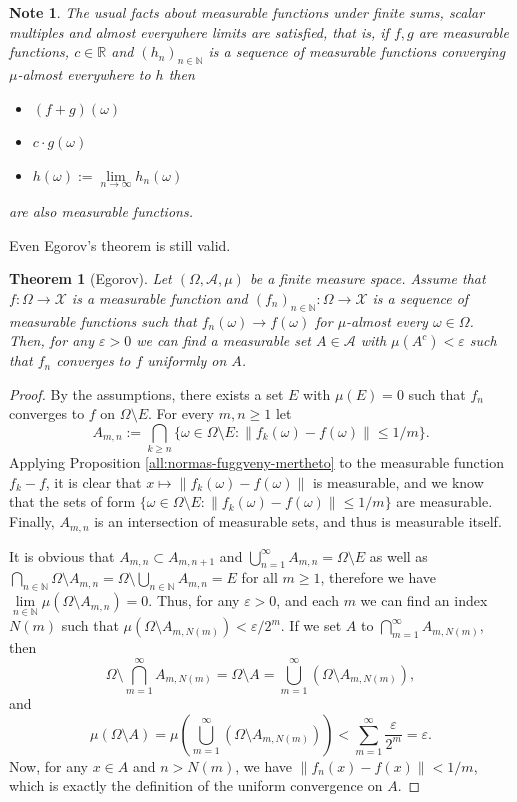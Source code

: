 \documentclass[a4paper, 12pt]{article}
\newtheorem{theo}[lem]{Theorem}
\newtheorem{note}[lem]{Note}
\begin{document}
\begin{note}\normalfont The usual facts about measurable functions under finite sums, scalar multiples and almost everywhere limits are satisfied, that is, if $f, g$ are measurable functions, $c \in \mathbb{R}$ and $(h_n)_{n \in \mathbb{N}}$ is a sequence of measurable functions converging $\mu$-almost everywhere to $h$ then
\begin{itemize}
\item $(f+g)(\omega)$
\item $c\cdot g(\omega)$
\item $h(\omega) := \lim\limits_{n \to \infty} h_n(\omega)$
\end{itemize}
are also measurable functions.
\end{note}
Even Egorov's theorem is still valid.
\begin{theo}[Egorov] \label{all:egorov} Let $(\Omega, \mathcal{A}, \mu)$ be a finite measure space. Assume that $f \colon \Omega \rightarrow \mathcal{X}$ is a measurable function and $(f_n)_{n \in \mathbb{N}} \colon \Omega \rightarrow \mathcal{X}$ is a sequence of measurable functions such that $f_n(\omega) \rightarrow f(\omega)$ for $\mu$-almost every $\omega \in \Omega$. Then, for any $\varepsilon > 0$ we can find a measurable set $A \in \mathcal{A}$ with $\mu(A^c) < \varepsilon$ such that $f_n$ converges to $f$ uniformly on $A$.
\end{theo}
\begin{proof} By the assumptions, there exists a set $E$ with $\mu(E)=0$ such that $f_n$ converges to $f$ on $\Omega \setminus E$. For every $m, n \geqslant 1$ let $$A_{m,n} := \bigcap_{k \geqslant n} \lbrace \omega \in \Omega \setminus E : \| f_k(\omega) - f(\omega) \| \leqslant 1/m \rbrace.$$ Applying Proposition \ref{all:normas-fuggveny-mertheto} to the measurable function $f_k - f$, it is clear that $x \mapsto \| f_k(\omega) - f(\omega) \|$ is measurable, and we know that the sets of form $\lbrace \omega \in \Omega \setminus E : \| f_k(\omega) - f(\omega) \| \leqslant 1/m \rbrace$ are measurable. Finally, $A_{m,n}$ is an intersection of measurable sets, and thus is measurable itself.

It is obvious that $A_{m, n} \subset A_{m, n+1}$ and $\bigcup^{\infty}_{n=1} A_{m,n} = \Omega \setminus E$ as well as $\bigcap_{n \in \mathbb{N}} \Omega \setminus A_{m,n} = \Omega \setminus \bigcup_{n \in  \mathbb{N}} A_{m,n} = E$ for all $m \geqslant 1$, therefore we have $\lim\limits_{n \in \mathbb{N}} \mu(\Omega \setminus A_{m,n}) = 0$. Thus, for any $\varepsilon > 0$, and each $m$ we can find an index $N(m)$ such that $\mu \left( \Omega \setminus A_{m, N(m)} \right) < \varepsilon / 2^m$. If we set $A$ to $\bigcap^{\infty}_{m=1} A_{m,N(m)}$, then 
$$
\Omega \setminus \bigcap^{\infty}_{m=1} A_{m,N(m)} = \Omega \setminus A = \bigcup^{\infty}_{m=1} \left( \Omega \setminus A_{m,N(m)} \right),
$$
and 
$$
\mu\left( \Omega \setminus A \right) = \mu \left(  \bigcup^{\infty}_{m=1} \left( \Omega \setminus A_{m,N(m)} \right) \right) < \sum^{\infty}_{m=1} \frac{\varepsilon}{2^m} = \varepsilon.
$$
Now, for any $x \in A$ and $n > N(m)$, we have $\| f_n(x) - f(x) \| < 1/m$, which is exactly the definition of the uniform convergence on $A$.
\end{proof}
\end{document}

